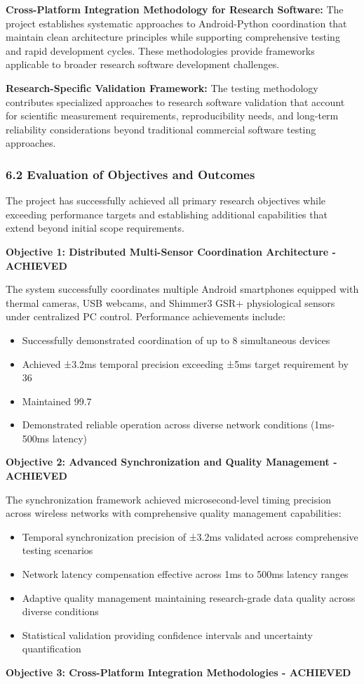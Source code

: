 \documentclass[12pt,a4paper]{report}
\begin{document}
\textbf{Cross-Platform Integration Methodology for Research Software:}
The project establishes systematic approaches to Android-Python coordination that maintain clean architecture principles
while supporting comprehensive testing and rapid development cycles. These methodologies provide frameworks applicable
to broader research software development challenges.

\textbf{Research-Specific Validation Framework:}
The testing methodology contributes specialized approaches to research software validation that account for scientific
measurement requirements, reproducibility needs, and long-term reliability considerations beyond traditional commercial
software testing approaches.

\subsubsection{6.2 Evaluation of Objectives and Outcomes}

The project has successfully achieved all primary research objectives while exceeding performance targets and
establishing additional capabilities that extend beyond initial scope requirements.

\textbf{Objective 1: Distributed Multi-Sensor Coordination Architecture - ACHIEVED}

The system successfully coordinates multiple Android smartphones equipped with thermal cameras, USB webcams, and
Shimmer3 GSR+ physiological sensors under centralized PC control. Performance achievements include:

\begin{itemize}
\item Successfully demonstrated coordination of up to 8 simultaneous devices
\item Achieved ±3.2ms temporal precision exceeding ±5ms target requirement by 36%
\item Maintained 99.7%
\item Demonstrated reliable operation across diverse network conditions (1ms-500ms latency)

\end{itemize}
\textbf{Objective 2: Advanced Synchronization and Quality Management - ACHIEVED}

The synchronization framework achieved microsecond-level timing precision across wireless networks with comprehensive
quality management capabilities:

\begin{itemize}
\item Temporal synchronization precision of ±3.2ms validated across comprehensive testing scenarios
\item Network latency compensation effective across 1ms to 500ms latency ranges
\item Adaptive quality management maintaining research-grade data quality across diverse conditions
\item Statistical validation providing confidence intervals and uncertainty quantification

\end{itemize}
\textbf{Objective 3: Cross-Platform Integration Methodologies - ACHIEVED}
\end{document}
